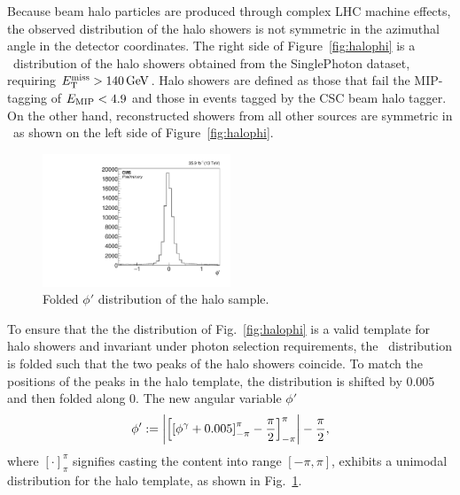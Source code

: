 Because beam halo particles are produced through complex LHC machine effects, the observed distribution of the halo showers is not
symmetric in the azimuthal angle in the detector coordinates.
The right side of Figure~\ref{fig:halophi} is a \phig\ distribution of the halo showers obtained from the SinglePhoton dataset, requiring $E_{\mathrm{T}}^{\text{miss}} > 140\,\text{Ge\hspace{-.08em}V}$. 
Halo showers are defined as those that fail the MIP-tagging of $E_{\text{MIP}} < 4.9$ and those in events tagged by the CSC beam halo tagger.
On the other hand, reconstructed showers from all other sources are symmetric in \phig\, as shown on the left side of Figure~\ref{fig:halophi}. 

\begin{figure}[htbp]
  \centering
  \includegraphics[width=0.5\textwidth]{Reconstruction/Figures/halo/haloPhiFolded.pdf}
  \caption{
    Folded $\phi'$ distribution of the halo sample.
  }
  \label{fig:halo_template}
\end{figure}

To ensure that the the distribution of Fig.~\ref{fig:halophi} is a valid template for halo showers and invariant under photon selection requirements, the \phig\ distribution is folded such that the two peaks of the halo showers coincide.
To match the positions of the peaks in the halo template, the distribution is shifted by 0.005 and then folded along 0. 
The new angular variable $\phi'$
\begin{equation}
  \phi' := \left|\left[\left[\phi^{\gamma} + 0.005\right]_{-\pi}^{\pi} - \frac{\pi}{2}\right]_{-\pi}^{\pi}\right| - \frac{\pi}{2},
  \label{eqn:phi}
\end{equation}
where $[\cdot]_{\pi}^{\pi}$ signifies casting the content into range $[-\pi,\pi]$,
exhibits a unimodal distribution for the halo template, as shown in Fig.~\ref{fig:halo_template}.

